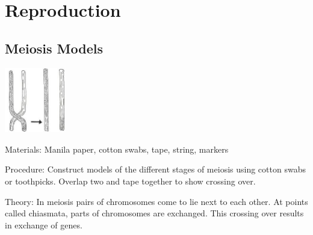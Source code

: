 \section{Reproduction}

\begin{multicols}{2}


\subsection{Meiosis Models} %

\begin{center}
\includegraphics[width=0.2\textwidth]{./img/vso/cross-over.jpg}
\end{center}

\begin{description*}
\item[Materials:]{Manila paper, cotton swabs, tape, string, markers}
\item[Procedure:]{Construct models of the different stages of meiosis using cotton swabs or toothpicks. Overlap two and tape together to show crossing over.}
\item[Theory:]{In
meiosis pairs of chromosomes
come to lie next to each other. At
points called chiasmata, parts of
chromosomes are exchanged. This
crossing over results in exchange
of genes.}
\end{description*}


\end{multicols}
